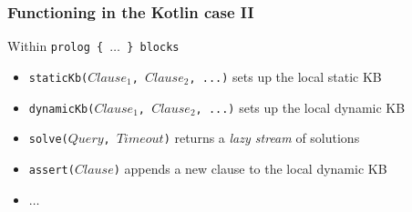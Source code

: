 \documentclass[presentation]{beamer}
\begin{document}

\begin{frame}%
\frametitle{Functioning in the Kotlin case II}

    \begin{block}{Within \texttt{prolog \{ $\ldots$ \} blocks}}
        \begin{itemize}
            \item \alert{\texttt{staticKb($Clause_1$, $Clause_2$, ...)}} sets up the local \alert{static} KB
            \item \alert{\texttt{dynamicKb($Clause_1$, $Clause_2$, ...)}} sets up the local \alert{dynamic} KB
            \item \alert{\texttt{solve($Query$, $Timeout$)}} returns a \emph{lazy stream} of solutions
            \item \alert{\texttt{assert($Clause$)}} appends a new clause to the local \alert{dynamic} KB
            \item $\ldots$
        \end{itemize}
    \end{block}

\end{frame}
\end{document}
